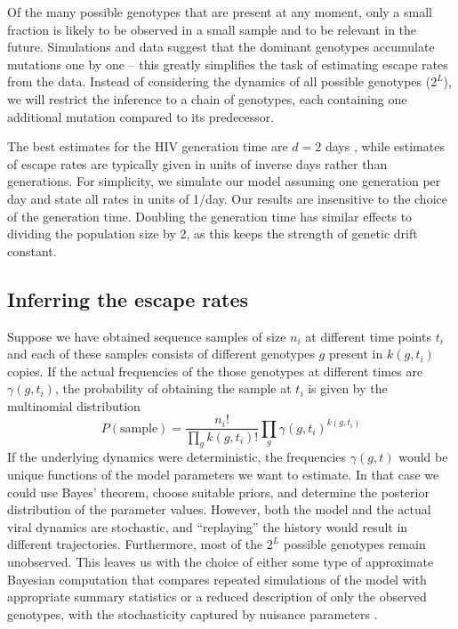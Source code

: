 \documentclass{frontiers}
\newcommand{\gt}{g}
\newcommand{\gtfreq}{\gamma}
\begin{document}
Of the many possible genotypes that are present at any moment, only a
small fraction is likely to be observed in a small sample and to be
relevant in the future. Simulations and data suggest that the dominant
genotypes accumulate mutations one by one -- this greatly simplifies the
task of estimating escape rates from the data. Instead of considering
the dynamics of all possible genotypes ($2^L$), we will restrict the
inference to a chain of genotypes, each containing one additional
mutation compared to its predecessor.

The best estimates for the HIV generation time are $d=2$ days
\cite{markowitz_novel_2003}, while estimates of escape rates are
typically given in units of inverse days rather than generations. For
simplicity, we simulate our model assuming one generation per day and
state all rates in units of 1/day. Our results are insensitive to the
choice of the generation time. Doubling the generation time has similar
effects to dividing the population size by 2, as this keeps the strength
of genetic drift constant. 


\subsection{Inferring the escape rates}
Suppose we have obtained sequence samples of size $n_i$ at different time points
$t_i$ and each of these samples consists of different genotypes $\gt$ present in
$k(\gt,t_i)$ copies. If the actual frequencies of the those genotypes at
different times are $\gtfreq(\gt,t_i)$, the probability of obtaining the sample at
$t_i$ is  given by the multinomial distribution
\begin{equation}
P(\mathrm{sample}) = \frac{n_i!}{\prod_\gt
k(\gt,t_i)!}\prod_{\gt}\gtfreq(\gt,t_i)^{k(\gt,t_i)}
\end{equation}
If the underlying dynamics were deterministic, the frequencies $\gtfreq(\gt,t)$
would be unique functions of the model parameters we want to estimate. In that
case we could use Bayes' theorem, choose suitable priors, and determine the
posterior distribution of the parameter values. However, both the
model and the actual viral dynamics are stochastic, and ``replaying''
the history would result in different trajectories. Furthermore, most of the $2^L$ possible
genotypes remain unobserved. This leaves us with the choice of either
some type of approximate Bayesian computation that compares repeated simulations
of the model with appropriate summary statistics \citep{sunnaker_approximate_2013} 
or a reduced description
of only the observed genotypes, with the stochasticity captured by nuisance parameters
\citep{basu_elimination_1977}.
\end{document}
